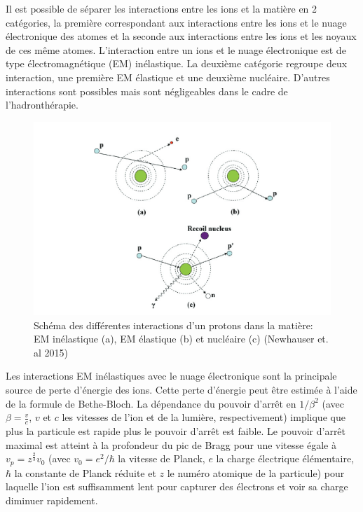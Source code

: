 \documentclass[11pt,a4paper,oldfontcommands]{memoir}
\begin{document}
Il est possible de séparer les interactions entre les ions et la matière en 2 catégories, la première correspondant aux interactions entre les ions et le nuage électronique des atomes et la seconde aux interactions entre les ions et les noyaux de ces même atomes. L'interaction entre un ions et le nuage électronique est de type électromagnétique (EM) inélastique. La deuxième catégorie regroupe deux interaction, une première EM élastique et une deuxième nucléaire. D'autres interactions sont possibles mais sont négligeables dans le cadre de l'hadronthérapie.\\
\begin{figure}[h!]
    \centering
    \includegraphics{intro/Newhauser2015.PNG}
    \caption{Schéma des différentes interactions d'un protons dans la matière: EM inélastique (a), EM élastique (b) et nucléaire (c) (Newhauser et. al 2015)}
    \label{fig:my_label}
\end{figure}

Les interactions EM inélastiques avec le nuage électronique sont la principale source de perte d'énergie des ions.  Cette perte d'énergie peut être estimée à l'aide de la formule de Bethe-Bloch. La dépendance du pouvoir d'arrêt en $1/\beta^2$ (avec $\beta = \frac{v}{c}$, $v$ et $c$ les vitesses de l'ion et de la lumière, respectivement) implique que plus la particule est rapide plus le pouvoir d'arrêt est faible. Le pouvoir d'arrêt maximal est atteint à la profondeur du pic de Bragg pour une vitesse égale à $v_p = z^{\frac{2}{3}}v_0$ (avec $v_0 = e^2/\hbar$ la vitesse de Planck, $e$ la charge électrique élémentaire, $\hbar$ la constante de Planck réduite et $z$ le numéro atomique de la particule) pour laquelle l'ion est suffisamment lent pour capturer des électrons et voir sa charge diminuer rapidement. 
\end{document}
